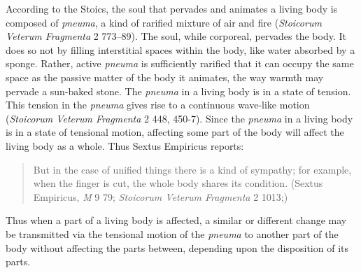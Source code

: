 
According to the Stoics, the soul that pervades and animates a living body is composed of \emph{pneuma}, a kind of rarified mixture of air and fire (\emph{Stoicorum Veterum Fragmenta} 2 773--89). The soul, while corporeal, pervades the body. It does so not by filling interstitial spaces within the body, like water absorbed by a sponge. Rather, active \emph{pneuma} is sufficiently rarified that it  can occupy the same space as the passive matter of the body it animates, the way warmth may pervade a sun-baked stone. The \emph{pneuma} in a living body is in a state of tension. This tension in the \emph{pneuma} gives rise to a continuous wave-like motion (\emph{Stoicorum Veterum Fragmenta} 2 448, 450-7). Since the \emph{pneuma} in a living body is in a state of tensional motion, affecting some part of the body will affect the living body as a whole. Thus Sextus Empiricus reports: 
\begin{quote}
	But in the case of unified things there is a kind of sympathy; for example, when the finger is cut, the whole body shares its condition. (Sextus Empiricus, \emph{M} 9 79; \emph{Stoicorum Veterum Fragmenta} 2 1013;)
\end{quote}
Thus when a part of a living body is affected, a similar or different change may be transmitted via the tensional motion of the \emph{pneuma} to another part of the body without affecting the parts between, depending upon the disposition of its parts.

